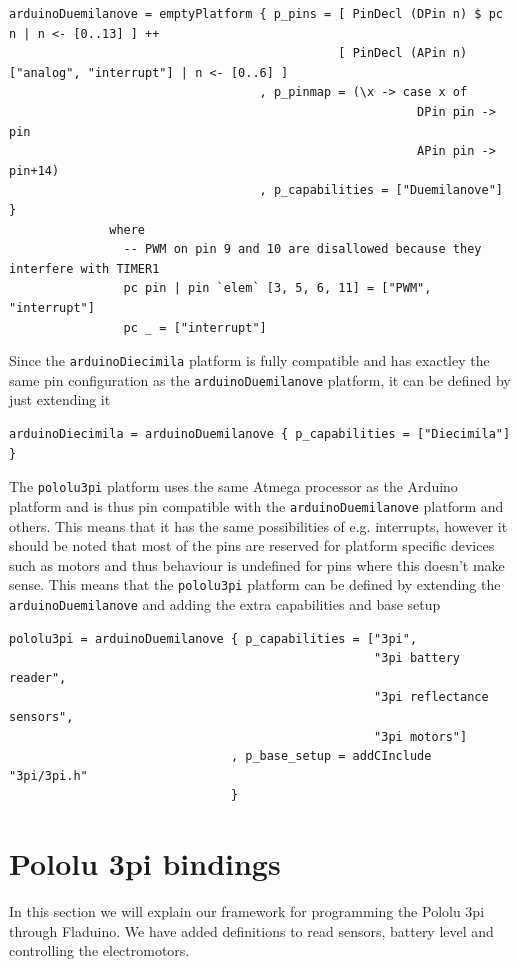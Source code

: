 \documentclass[a4paper, oneside, final]{memoir}
\begin{document}
\begin{verbatim}
arduinoDuemilanove = emptyPlatform { p_pins = [ PinDecl (DPin n) $ pc n | n <- [0..13] ] ++
                                              [ PinDecl (APin n) ["analog", "interrupt"] | n <- [0..6] ]
                                   , p_pinmap = (\x -> case x of
                                                         DPin pin -> pin
                                                         APin pin -> pin+14)
                                   , p_capabilities = ["Duemilanove"] }
              where
                -- PWM on pin 9 and 10 are disallowed because they interfere with TIMER1
                pc pin | pin `elem` [3, 5, 6, 11] = ["PWM", "interrupt"] 
                pc _ = ["interrupt"]
\end{verbatim}

Since the \texttt{arduinoDiecimila} platform is fully compatible and has
exactley the same pin configuration as the \texttt{arduinoDuemilanove} platform,
it can be defined by just extending it

\begin{verbatim}
arduinoDiecimila = arduinoDuemilanove { p_capabilities = ["Diecimila"] }
\end{verbatim}

The \texttt{pololu3pi} platform uses the same Atmega processor as the Arduino
platform and is thus pin compatible with the \texttt{arduinoDuemilanove}
platform and others. This means that it has the same possibilities of e.g.
interrupts, however it should be noted that most of the pins are reserved
\cite{3pi_pin_mapping} for platform specific devices such as motors and thus
behaviour is undefined for pins where this doesn't make sense. This means that
the \texttt{pololu3pi} platform can be defined by extending the
\texttt{arduinoDuemilanove} and adding the extra capabilities and base setup

\begin{verbatim}
pololu3pi = arduinoDuemilanove { p_capabilities = ["3pi", 
                                                   "3pi battery reader", 
                                                   "3pi reflectance sensors",
                                                   "3pi motors"]
                               , p_base_setup = addCInclude "3pi/3pi.h"
                               }
\end{verbatim}


\section{Pololu 3pi bindings}
In this section we will explain our framework for programming the
Pololu 3pi through Fladuino. We have added definitions to read
sensors, battery level and controlling the electromotors.
\end{document}
